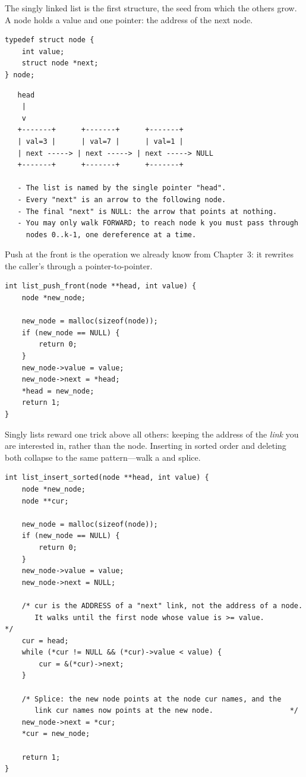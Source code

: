 The singly linked list is the first structure, the seed from which the
others grow. A node holds a value and one pointer: the address of the
next node.

\begin{lstlisting}[caption={The singly linked node.}]
typedef struct node {
    int value;
    struct node *next;
} node;
\end{lstlisting}

\begin{verbatim}
   head
    |
    v
   +-------+      +-------+      +-------+
   | val=3 |      | val=7 |      | val=1 |
   | next -----> | next -----> | next -----> NULL
   +-------+      +-------+      +-------+

   - The list is named by the single pointer "head".
   - Every "next" is an arrow to the following node.
   - The final "next" is NULL: the arrow that points at nothing.
   - You may only walk FORWARD; to reach node k you must pass through
     nodes 0..k-1, one dereference at a time.
\end{verbatim}

Push at the front is the operation we already know from Chapter~3: it
rewrites the caller's  through a pointer-to-pointer.

\begin{lstlisting}[caption={Push at the front. Returns 1 on success.}]
int list_push_front(node **head, int value) {
    node *new_node;

    new_node = malloc(sizeof(node));
    if (new_node == NULL) {
        return 0;
    }
    new_node->value = value;
    new_node->next = *head;
    *head = new_node;
    return 1;
}
\end{lstlisting}

Singly lists reward one trick above all others: keeping the address of
the \emph{link} you are interested in, rather than the node. Inserting
in sorted order and deleting both collapse to the same pattern---walk a
 and splice.

\begin{lstlisting}[caption={Insert keeping the list sorted ascending.}]
int list_insert_sorted(node **head, int value) {
    node *new_node;
    node **cur;

    new_node = malloc(sizeof(node));
    if (new_node == NULL) {
        return 0;
    }
    new_node->value = value;
    new_node->next = NULL;

    /* cur is the ADDRESS of a "next" link, not the address of a node.
       It walks until the first node whose value is >= value.        */
    cur = head;
    while (*cur != NULL && (*cur)->value < value) {
        cur = &(*cur)->next;
    }

    /* Splice: the new node points at the node cur names, and the
       link cur names now points at the new node.                  */
    new_node->next = *cur;
    *cur = new_node;

    return 1;
}
\end{lstlisting}

